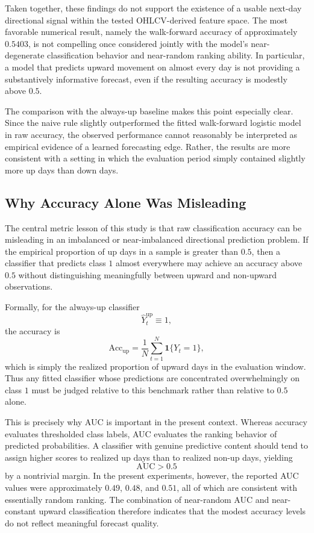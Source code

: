 \documentclass[11pt,a4paper]{article}
\begin{document}
	Taken together, these findings do not support the existence of a usable next-day directional signal within the tested OHLCV-derived feature space. The most favorable numerical result, namely the walk-forward accuracy of approximately \(0.5403\), is not compelling once considered jointly with the model's near-degenerate classification behavior and near-random ranking ability. In particular, a model that predicts upward movement on almost every day is not providing a substantively informative forecast, even if the resulting accuracy is modestly above \(0.5\).
	
	The comparison with the always-up baseline makes this point especially clear. Since the naive rule slightly outperformed the fitted walk-forward logistic model in raw accuracy, the observed performance cannot reasonably be interpreted as empirical evidence of a learned forecasting edge. Rather, the results are more consistent with a setting in which the evaluation period simply contained slightly more up days than down days.
	
	\subsection{Why Accuracy Alone Was Misleading}
	
	The central metric lesson of this study is that raw classification accuracy can be misleading in an imbalanced or near-imbalanced directional prediction problem. If the empirical proportion of up days in a sample is greater than \(0.5\), then a classifier that predicts class \(1\) almost everywhere may achieve an accuracy above \(0.5\) without distinguishing meaningfully between upward and non-upward observations.
	
	Formally, for the always-up classifier
	\[
	\widehat{Y}_t^{\mathrm{up}} \equiv 1,
	\]
	the accuracy is
	\[
	\mathrm{Acc}_{\mathrm{up}}
	=
	\frac{1}{N}\sum_{t=1}^N \mathbf{1}\{Y_t = 1\},
	\]
	which is simply the realized proportion of upward days in the evaluation window. Thus any fitted classifier whose predictions are concentrated overwhelmingly on class \(1\) must be judged relative to this benchmark rather than relative to \(0.5\) alone.
	
	This is precisely why AUC is important in the present context. Whereas accuracy evaluates thresholded class labels, AUC evaluates the ranking behavior of predicted probabilities. A classifier with genuine predictive content should tend to assign higher scores to realized up days than to realized non-up days, yielding
	\[
	\mathrm{AUC} > 0.5
	\]
	by a nontrivial margin. In the present experiments, however, the reported AUC values were approximately \(0.49\), \(0.48\), and \(0.51\), all of which are consistent with essentially random ranking. The combination of near-random AUC and near-constant upward classification therefore indicates that the modest accuracy levels do not reflect meaningful forecast quality.
	
\end{document}
